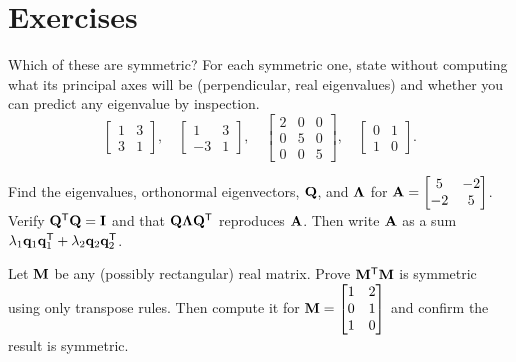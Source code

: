 \section{Exercises}
\label{ch26:exercises}

\begin{exercise}
\label{ch26:ex-spot}
Which of these are symmetric? For each symmetric one, state without computing what
its principal axes will be (perpendicular, real eigenvalues) and whether you can
predict any eigenvalue by inspection.
\[
  \begin{bmatrix}1&3\\3&1\end{bmatrix},\quad
  \begin{bmatrix}1&3\\-3&1\end{bmatrix},\quad
  \begin{bmatrix}2&0&0\\0&5&0\\0&0&5\end{bmatrix},\quad
  \begin{bmatrix}0&1\\1&0\end{bmatrix}.
\]
\end{exercise}

\begin{exercise}
\label{ch26:ex-byhand}
Find the eigenvalues, orthonormal eigenvectors, $\mathbf{Q}$, and $\mathbf{\Lambda}$ for
$\mathbf{A}=\begin{bmatrix}5&-2\\-2&5\end{bmatrix}$. Verify $\mathbf{Q}^{\mathsf{T}}\mathbf{Q}=\mathbf{I}$
and that $\mathbf{Q}\mathbf{\Lambda}\mathbf{Q}^{\mathsf{T}}$ reproduces $\mathbf{A}$. Then write $\mathbf{A}$
as a sum $\lambda_1\mathbf{q}_1\mathbf{q}_1^{\mathsf{T}} + \lambda_2\mathbf{q}_2\mathbf{q}_2^{\mathsf{T}}$.
\end{exercise}

\begin{exercise}
\label{ch26:ex-gram}
Let $\mathbf{M}$ be any (possibly rectangular) real matrix. Prove
$\mathbf{M}^{\mathsf{T}}\mathbf{M}$ is symmetric using only transpose rules. Then compute it for
$\mathbf{M}=\begin{bmatrix}1&2\\0&1\\1&0\end{bmatrix}$ and confirm the result is
symmetric.
\end{exercise}

